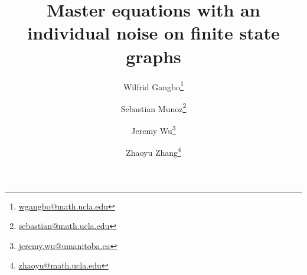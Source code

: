 \documentclass[10pt]{article}
\numberwithin{equation}{section}
\begin{document}
 


\title{Master equations with an individual noise on finite state graphs}
\author[1]{Wilfrid Gangbo\thanks{\href{mailto:wgangbo@math.ucla.edu}{wgangbo@math.ucla.edu}}}
\author[1]{Sebastian Munoz\thanks{\href{mailto:sebastian@math.ucla.edu}{sebastian@math.ucla.edu}}}
\author[2]{Jeremy Wu\thanks{\href{mailto:jeremy.wu@umanitoba.ca}{jeremy.wu@umanitoba.ca}}}
\author[1]{Zhaoyu Zhang\thanks{\href{mailto:zhaoyu@math.ucla.edu}{zhaoyu@math.ucla.edu}}}




\date{}
\maketitle
\end{document}
